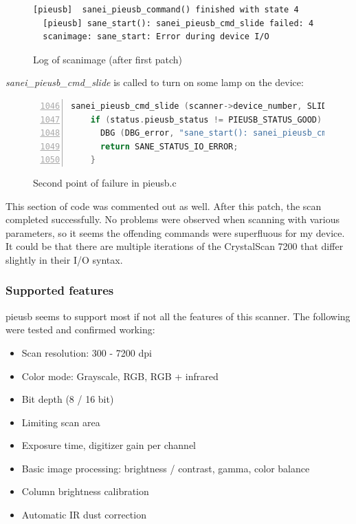 \documentclass{article}
\begin{document}
\begin{figure}[H]
  \begin{lstlisting}[language={}]
  [pieusb] 	sanei_pieusb_command() finished with state 4
  [pieusb] sane_start(): sanei_pieusb_cmd_slide failed: 4
  scanimage: sane_start: Error during device I/O
  \end{lstlisting}
  \caption{Log of scanimage (after first patch)}
\end{figure}

{\it sanei\_pieusb\_cmd\_slide} is called to turn on some lamp on the device:

\begin{figure}[H]
  \begin{lstlisting}[language=C, breaklines=true, numbers=left, firstnumber=1046]
    sanei_pieusb_cmd_slide (scanner->device_number, SLIDE_LAMP_ON, &status);
    if (status.pieusb_status != PIEUSB_STATUS_GOOD) {
      DBG (DBG_error, "sane_start(): sanei_pieusb_cmd_slide failed: %d\n", status.pieusb_status);
      return SANE_STATUS_IO_ERROR;
    }
  \end{lstlisting}
  \caption{Second point of failure in pieusb.c}
\end{figure}

This section of code was commented out as well. After this patch, the scan
completed successfully. No problems were observed when scanning with various
parameters, so it seems the offending commands were superfluous for my device.
It could be that there are multiple iterations of the CrystalScan 7200 that differ
slightly in their I/O syntax.

\subsubsection{Supported features}

pieusb seems to support most if not all the features of this scanner.
The following were tested and confirmed working:

\begin{itemize}
  \item Scan resolution: 300 - 7200 dpi
  \item Color mode: Grayscale, RGB, RGB + infrared
  \item Bit depth (8 / 16 bit)
  \item Limiting scan area
  \item Exposure time, digitizer gain per channel
  \item Basic image processing: brightness / contrast, gamma, color balance
  \item Column brightness calibration
  \item Automatic IR dust correction
\end{itemize}
\end{document}
